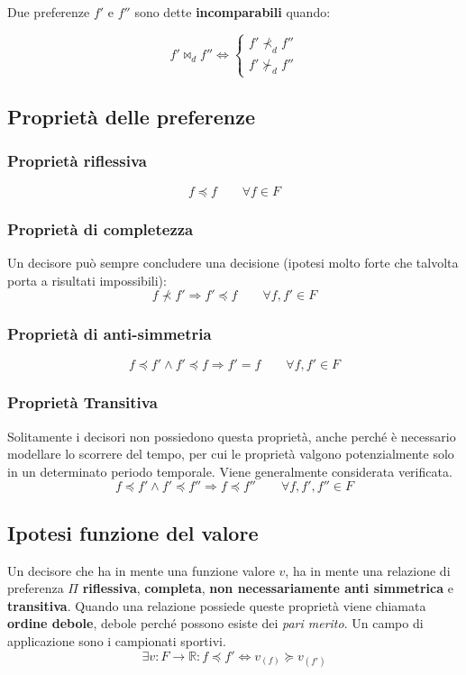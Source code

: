 \documentclass[\main/main.tex]{subfiles}
\begin{document}
\begin{definition}[Incomparabilità]
Due preferenze $f'$ e $f''$ sono dette \textbf{incomparabili} quando:

\[
	f' \Join_d f'' \Leftrightarrow
	\begin{cases}
		f' \nprec_d f'' \\
		f' \nsucc_d f''
	\end{cases}
\] 
\end{definition}


\subsection{Proprietà delle preferenze}
\subsubsection{Proprietà riflessiva}
\[
	f \preccurlyeq f \qquad \forall f \in F
\]

\subsubsection{Proprietà di completezza}
Un decisore può sempre concludere una decisione (ipotesi molto forte che talvolta porta a risultati impossibili):
\[
	f \nprec f' \Rightarrow f' \preccurlyeq f \qquad \forall f, f' \in F
\]

\subsubsection{Proprietà di anti-simmetria}
\[
	f \preccurlyeq f' \wedge f' \preccurlyeq f \Rightarrow f' = f \qquad \forall f, f' \in F
\]

\subsubsection{Proprietà Transitiva}
Solitamente i decisori non possiedono questa proprietà, anche perché è necessario modellare lo scorrere del tempo, per cui le proprietà valgono potenzialmente solo in un determinato periodo temporale. Viene generalmente considerata verificata.
\[
	f \preccurlyeq f' \wedge f' \preccurlyeq f'' \Rightarrow f \preccurlyeq f'' \qquad \forall f, f', f'' \in F
\]

\subsection{Ipotesi funzione del valore}
Un decisore che ha in mente una funzione valore $v$, ha in mente una relazione di preferenza $\Pi$ \textbf{riflessiva}, \textbf{completa}, \textbf{non necessariamente anti simmetrica} e \textbf{transitiva}. Quando una relazione possiede queste proprietà viene chiamata \textbf{ordine debole}, debole perché possono esiste dei \textit{pari merito}. Un campo di applicazione sono i campionati sportivi.
\[
	\exists v: F\rightarrow \mathbb{R}: f \preccurlyeq f' \Leftrightarrow v_{(f)} \succcurlyeq v_{(f')}
\]
\end{document}
